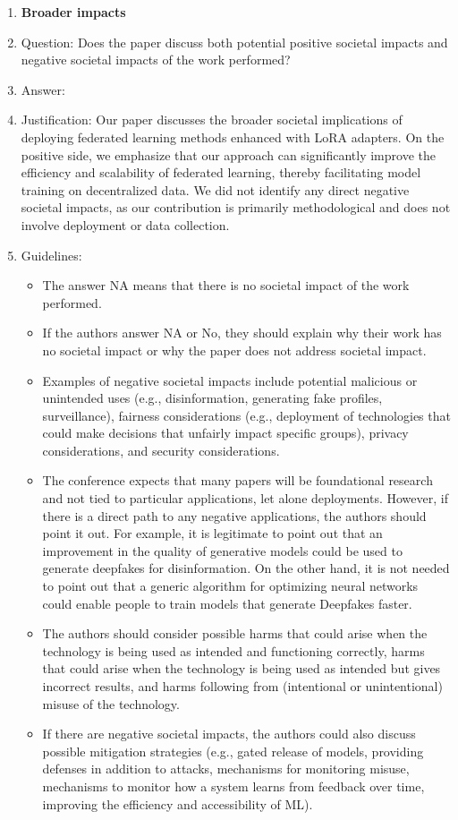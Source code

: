 \documentclass{article}
\theoremstyle{plain}
\theoremstyle{definition}
\theoremstyle{remark}
\begin{document}
\begin{enumerate}
\item {\bf Broader impacts}
    \item[] Question: Does the paper discuss both potential positive societal impacts and negative societal impacts of the work performed?
    \item[] Answer: \answerYes{} %
    \item[] Justification: Our paper discusses the broader societal implications of deploying federated learning methods enhanced with LoRA adapters. On the positive side, we emphasize that our approach can significantly improve the efficiency and scalability of federated learning, thereby facilitating model training on decentralized data. We did not identify any direct negative societal impacts, as our contribution is primarily methodological and does not involve deployment or data collection. 

    \item[] Guidelines:
    \begin{itemize}
        \item The answer NA means that there is no societal impact of the work performed.
        \item If the authors answer NA or No, they should explain why their work has no societal impact or why the paper does not address societal impact.
        \item Examples of negative societal impacts include potential malicious or unintended uses (e.g., disinformation, generating fake profiles, surveillance), fairness considerations (e.g., deployment of technologies that could make decisions that unfairly impact specific groups), privacy considerations, and security considerations.
        \item The conference expects that many papers will be foundational research and not tied to particular applications, let alone deployments. However, if there is a direct path to any negative applications, the authors should point it out. For example, it is legitimate to point out that an improvement in the quality of generative models could be used to generate deepfakes for disinformation. On the other hand, it is not needed to point out that a generic algorithm for optimizing neural networks could enable people to train models that generate Deepfakes faster.
        \item The authors should consider possible harms that could arise when the technology is being used as intended and functioning correctly, harms that could arise when the technology is being used as intended but gives incorrect results, and harms following from (intentional or unintentional) misuse of the technology.
        \item If there are negative societal impacts, the authors could also discuss possible mitigation strategies (e.g., gated release of models, providing defenses in addition to attacks, mechanisms for monitoring misuse, mechanisms to monitor how a system learns from feedback over time, improving the efficiency and accessibility of ML).
    \end{itemize}
    

\end{enumerate}
\end{document}
